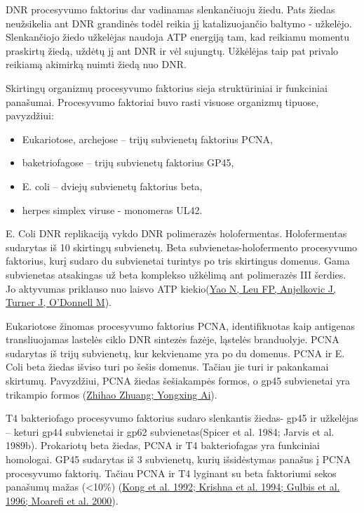 \documentclass[a4paper,12pt]{article}
\begin{document}
\qquad DNR procesyvumo faktorius dar vadinamas slenkančiuoju žiedu. Pats žiedas neužsikelia ant DNR grandinės todėl reikia jį katalizuojančio baltymo - užkelėjo. Slenkančiojo žiedo užkelėjas naudoja ATP energiją tam, kad  reikiamu momentu praskirtų žiedą, uždėtų jį ant DNR ir vėl sujungtų. Užkėlėjas taip pat privalo reikiamą akimirką nuimti žiedą nuo DNR.

\qquad Skirtingų organizmų procesyvumo faktorius sieja struktūriniai ir funkciniai panašumai. Procesyvumo faktoriai buvo rasti visuose organizmų tipuose, pavyzdžiui:

\begin{itemize}
	\item Eukariotose, archejose – trijų subvienetų  faktorius PCNA, 
	\item baketriofagose – trijų subvienetų faktorius GP45,
	\item E. coli – dviejų subvienetų faktorius beta,
	\item herpes simplex viruse -  monomeras UL42.
\end{itemize}


\qquad E. Coli DNR replikaciją vykdo DNR polimerazės holofermentas. Holofermentas sudarytas iš 10 skirtingų subvienetų. Beta subvienetas-holofermento procesyvumo faktorius, kurį sudaro du subvienetai turintys po tris skirtingus domenus. Gama subvienetas atsakingas už beta komplekso užkėlimą ant polimerazės III šerdies. Jo aktyvumas priklauso nuo laisvo ATP kiekio(\hyperlink{YaoN}{Yao N, Leu FP, Anjelkovic J, Turner J, O'Donnell M}). 
	
\qquad Eukariotose žinomas procesyvumo faktorius PCNA, identifikuotas kaip antigenas transliuojamas lastelės ciklo DNR sintezės fazėje, ląstelės branduolyje. PCNA sudarytas iš trijų subvienetų, kur kekviename yra po du domenus. PCNA ir E. Coli beta žiedas išviso turi po šešis domenus. Tačiau jie turi ir pakankamai skirtumų. Pavyzdžiui, PCNA žiedas šešiakampės formos,  o gp45 subvienetai yra trikampio formos (\hyperlink{Zhihao}{Zhihao Zhuang; Yongxing Ai}).

\qquad T4 bakteriofago procesyvumo faktorius sudaro slenkantis žiedas- gp45 ir užkelėjas – keturi gp44 subvienetai ir gp62 subvienetas(Spicer et al. 1984; Jarvis et al. 1989b). Prokariotų beta žiedas, PCNA ir T4 bakteriofagas yra funkciniai homologai. GP45 sudarytas iš 3 subvienetų, kurių išsidėstymas panašus į PCNA procesyvumo faktorių. Tačiau PCNA ir T4 lyginant su beta faktoriumi sekos  panašumų mažas (<10\%) (\hyperlink{Kong}{Kong et al. 1992; Krishna et al. 1994; Gulbis et al. 1996; Moarefi et al. 2000}). 
\end{document}
